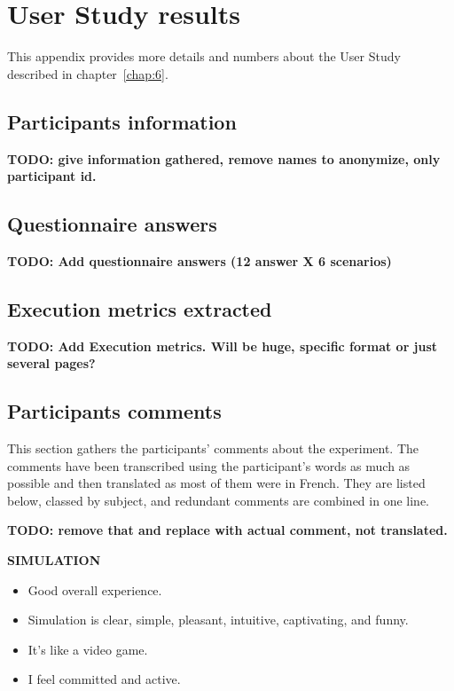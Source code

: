 \chapter{User Study results}
\label{ap:study}

This appendix provides more details and numbers about the User Study described in chapter~\ref{chap:6}.

\section{Participants information}

\textbf{TODO: give information gathered, remove names to anonymize, only participant id.}

\section{Questionnaire answers}

\textbf{TODO: Add questionnaire answers (12 answer X 6 scenarios)}

\section{Execution metrics extracted}

\textbf{TODO: Add Execution metrics. Will be huge, specific format or just several pages?}

\section{Participants comments}

This section gathers the participants' comments about the experiment. The comments have been transcribed using the participant's words as much as possible and then translated as most of them were in French. They are listed below, classed by subject, and redundant comments are combined in one line.

\textbf{TODO: remove that and replace with actual comment, not translated.}

\textbf{SIMULATION}
\begin{itemize}
\setlength\itemsep{-0.3em}
\item Good overall experience.
\item Simulation is clear, simple, pleasant, intuitive, captivating, and funny.
\item It's like a video game.
\item I feel committed and active.
\end{itemize}

